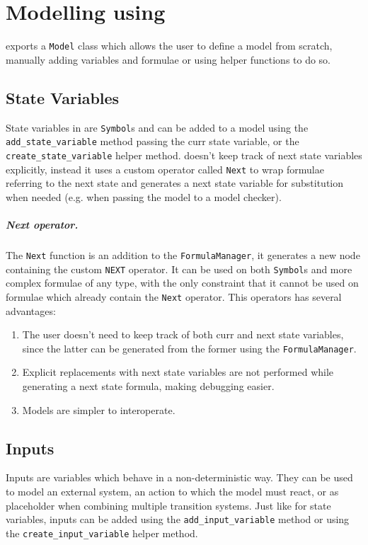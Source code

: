 \chapter{Modelling using \pyvmt{}}
\label{ch:modelling}

\pyvmt{} exports a \texttt{Model} class which allows the user to define a model from scratch, manually adding variables and formulae or using helper functions to do so.


\section{State Variables}
State variables in \pyvmt{} are \pysmt{} \texttt{Symbol}s and can be added to a model using the \texttt{add\_state\_variable} method passing the curr state variable, or the \texttt{create\_state\_variable} helper method.
\pyvmt{} doesn't keep track of next state variables explicitly, instead it uses a custom operator called \texttt{Next} to wrap formulae referring to the next state and generates a next state variable for substitution when needed (e.g. when passing the model to a model checker).

\paragraph*{Next operator.} The \texttt{Next} function is an addition to the \pysmt{} \texttt{FormulaManager}, it generates a new node containing the custom \texttt{NEXT} operator. It can be used on both \texttt{Symbol}s and more complex formulae of any type, with the only constraint that it cannot be used on formulae which already contain the \texttt{Next} operator. This operators has several advantages:
\begin{enumerate}
    \item The user doesn't need to keep track of both curr and next state variables, since the latter can be generated from the former using the \texttt{FormulaManager}.
    \item Explicit replacements with next state variables are not performed while generating a next state formula, making debugging easier.
    \item Models are simpler to interoperate.
\end{enumerate}

\section{Inputs}
Inputs are variables which behave in a non-deterministic way. They can be used to model an external system, an action to which the model must react, or as placeholder when combining multiple transition systems.
Just like for state variables, inputs can be added using the \texttt{add\_input\_variable} method or using the \texttt{create\_input\_variable} helper method.

